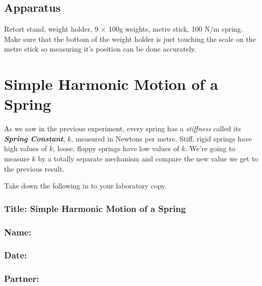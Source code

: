 \documentclass[
  letterpaper,
  DIV=11,
  numbers=noendperiod]{scrreprt}
\begin{document}
\section{Apparatus}\label{apparatus-3}

Retort stand, weight holder, 9 \(\times\) 100g weights, metre stick, 100
N/m spring. Make sure that the bottom of the weight holder is just
touching the scale on the metre stick so measuring it's position can be
done accurately.


\chapter{Simple Harmonic Motion of a
Spring}\label{simple-harmonic-motion-of-a-spring}

As we saw in the previous experiment, every spring has a
\emph{stiffness} called its \textbf{\emph{Spring Constant}}, \(k\),
measured in Newtons per metre. Stiff, rigid springs have high values of
\(k\), loose, floppy springs have low values of \(k\). We're going to
measure \(k\) by a totally separate mechanism and compare the new value
we get to the previous result.

Take down the following in to your laboratory copy.

\subsection*{\texorpdfstring{{Title: Simple Harmonic Motion of a
Spring}}{Title: Simple Harmonic Motion of a Spring}}\label{title-simple-harmonic-motion-of-a-spring}

\subsection*{\texorpdfstring{{Name:}}{Name:}}\label{name-3}

\subsection*{\texorpdfstring{{Date:}}{Date:}}\label{date-3}

\subsection*{\texorpdfstring{{Partner:}}{Partner:}}\label{partner-3}
\end{document}
